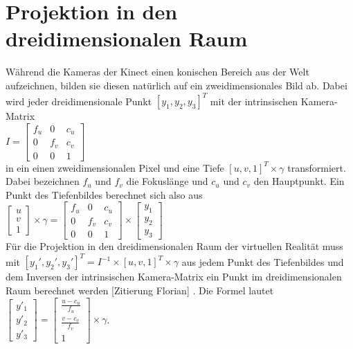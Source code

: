 \documentclass[a4paper]{IEEEtran}
\begin{document}
\section{Projektion in den dreidimensionalen Raum}
	Während die Kameras der Kinect einen konischen Bereich aus der Welt aufzeichnen, bilden sie diesen natürlich auf ein zweidimensionales Bild ab. 
	Dabei wird jeder dreidimensionale Punkt $[y_1,y_2,y_3]^T$ mit der intrinsischen Kamera-Matrix \\ [1cm]

$I = \begin{bmatrix}
f_u & 0 & c_u  \\
0 & f_v & c_v  \\
0 & 0 & 1  
\end{bmatrix}$\\[1cm]

	in ein einen zweidimensionalen Pixel und eine Tiefe $[u,v,1]^T \times \gamma$ transformiert. 
	Dabei bezeichnen $f_u$ und $f_v$ die Fokuslänge und $c_u$ und $c_v$ den Hauptpunkt. 
	Ein Punkt des Tiefenbildes berechnet sich also aus \\[1cm]

$\begin{bmatrix}
u \\
v \\
1
\end{bmatrix}
\times
\gamma
= \begin{bmatrix}
f_u & 0 & c_u  \\
0 & f_v & c_v  \\
0 & 0 & 1  
\end{bmatrix}
\times
\begin{bmatrix}
y_1 \\
y_2 \\
y_3
\end{bmatrix}$\\[1cm]

	Für die Projektion in den dreidimensionalen Raum der virtuellen Realität muss mit $[y_1',y_2',y_3']^T = I^{-1} \times [u,v,1]^T \times \gamma$ aus jedem Punkt des Tiefenbildes und dem Inversen der intrinsischen Kamera-Matrix ein Punkt im dreidimensionalen Raum berechnet werden [Zitierung Florian] \cite{ITM07_BrunnSawo}.
	Die Formel lautet \\[1cm]

$\begin{bmatrix}
y'_1 \\
y'_2 \\
y'_3
\end{bmatrix}
= \begin{bmatrix}
\frac{u - c_u}{f_u} \\
\frac{v - c_v}{f_v}  \\
1  
\end{bmatrix}
\times
\gamma$.\\[1cm]
\end{document}
